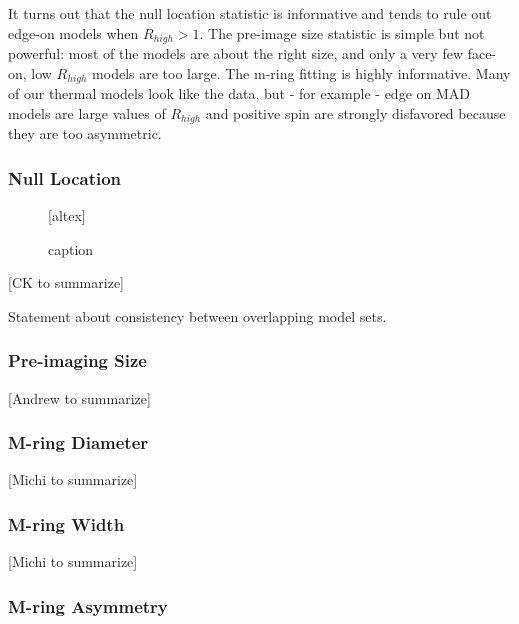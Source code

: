 It turns out that the null location statistic is informative and tends to rule out edge-on models when $R_{high} > 1$.  The pre-image size statistic is simple but not powerful: most of the models are about the right size, and only a very few face-on, low $R_{high}$ models are too large.   The m-ring fitting is highly informative.  Many of our thermal models look like the data, but - for example - edge on MAD models are large values of $R_{high}$ and positive spin are strongly disfavored because they are too asymmetric.

\subsubsection{Null Location}

\begin{figure}
    \centering
    [altex]
    \caption{caption}
    \label{fig:my_label}
\end{figure}

[CK to summarize]

Statement about consistency between overlapping model sets.

\subsubsection{Pre-imaging Size}

[Andrew to summarize]

\subsubsection{M-ring Diameter}

[Michi to summarize]

\subsubsection{M-ring Width}

[Michi to summarize]

\subsubsection{M-ring Asymmetry}

